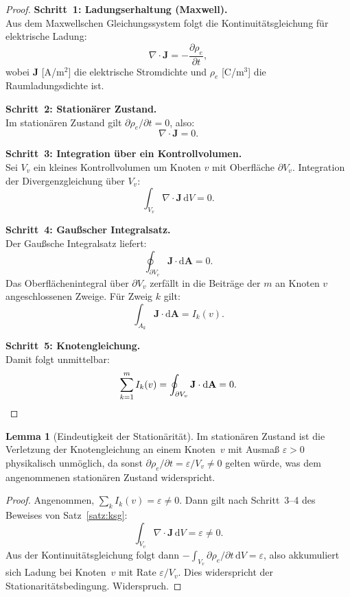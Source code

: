 ﻿\documentclass[a4paper,12pt]{article}
\theoremstyle{definition}
\newtheorem{lemma}{Lemma}
\begin{document}
\begin{proof}
  \textbf{Schritt~1: Ladungserhaltung (Maxwell).}\\
  Aus dem Maxwellschen Gleichungssystem folgt die Kontinuitätsgleichung
  für elektrische Ladung:
  \[
    \nabla \cdot \mathbf{J} = -\frac{\partial \rho_e}{\partial t},
  \]
  wobei $\mathbf{J}$ [A/m$^2$] die elektrische Stromdichte und $\rho_e$
  [C/m$^3$] die Raumladungsdichte ist.

  \textbf{Schritt~2: Stationärer Zustand.}\\
  Im stationären Zustand gilt $\partial \rho_e / \partial t = 0$, also:
  \[
    \nabla \cdot \mathbf{J} = 0.
  \]

  \textbf{Schritt~3: Integration über ein Kontrollvolumen.}\\
  Sei $V_v$ ein kleines Kontrollvolumen um Knoten $v$ mit Oberfläche
  $\partial V_v$. Integration der Divergenzgleichung über $V_v$:
  \[
    \int_{V_v} \nabla \cdot \mathbf{J}\, \mathrm{d}V = 0.
  \]

  \textbf{Schritt~4: Gaußscher Integralsatz.}\\
  Der Gaußsche Integralsatz liefert:
  \[
    \oint_{\partial V_v} \mathbf{J} \cdot \mathrm{d}\mathbf{A} = 0.
  \]
  Das Oberflächenintegral über $\partial V_v$ zerfällt in die Beiträge
  der $m$ an Knoten $v$ angeschlossenen Zweige. Für Zweig $k$ gilt:
  \[
    \int_{A_k} \mathbf{J} \cdot \mathrm{d}\mathbf{A} = I_k(v).
  \]

  \textbf{Schritt~5: Knotengleichung.}\\
  Damit folgt unmittelbar:
  \[
    \sum_{k=1}^{m} I_k(v) = \oint_{\partial V_v} \mathbf{J} \cdot \mathrm{d}\mathbf{A} = 0. \qedhere
  \]
\end{proof}

\begin{lemma}[Eindeutigkeit der Stationärität]
  \label{lem:stationaer}
  Im stationären Zustand ist die Verletzung der Knotengleichung an einem
  Knoten~$v$ mit Ausmaß $\varepsilon > 0$ physikalisch unmöglich, da sonst
  $\partial \rho_e / \partial t = \varepsilon / V_v \neq 0$ gelten würde, was
  dem angenommenen stationären Zustand widerspricht.
\end{lemma}

\begin{proof}
  Angenommen, $\sum_k I_k(v) = \varepsilon \neq 0$. Dann gilt nach
  Schritt~3--4 des Beweises von Satz~\ref{satz:ksg}:
  \[
    \int_{V_v} \nabla \cdot \mathbf{J}\, \mathrm{d}V = \varepsilon \neq 0.
  \]
  Aus der Kontinuitätsgleichung folgt dann
  $-\int_{V_v} \partial\rho_e/\partial t\, \mathrm{d}V = \varepsilon$,
  also akkumuliert sich Ladung bei Knoten~$v$ mit Rate $\varepsilon/V_v$.
  Dies widerspricht der Stationaritätsbedingung. Widerspruch. \qedhere
\end{proof}
\end{document}

